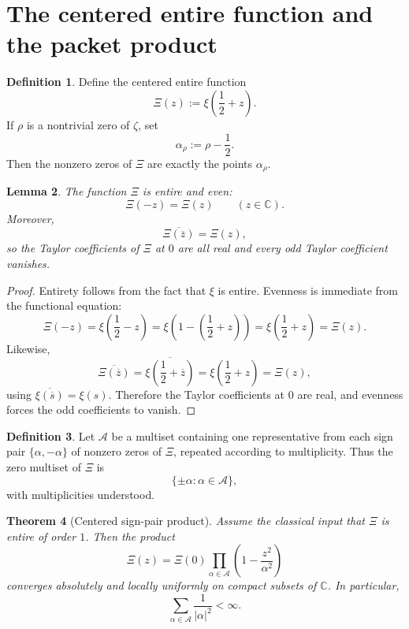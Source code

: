 \documentclass[11pt,a4paper]{article}
\numberwithin{equation}{section}
\newtheorem{theorem}{Theorem}[section]
\newtheorem{lemma}[theorem]{Lemma}
\theoremstyle{definition}
\newtheorem{definition}[theorem]{Definition}
\theoremstyle{remark}
\newcommand{\CC}{\mathbb C}
\begin{document}
\section{The centered entire function and the packet product}

\begin{definition}
Define the centered entire function
\[
\Xi(z):=\xi\!\left(\frac12+z\right).
\]
If $\rho$ is a nontrivial zero of $\zeta$, set
\[
\alpha_\rho:=\rho-\frac12.
\]
Then the nonzero zeros of $\Xi$ are exactly the points $\alpha_\rho$.
\end{definition}

\begin{lemma}\label{lem:Xi-even-and-real}
The function $\Xi$ is entire and even:
\[
\Xi(-z)=\Xi(z)
\qquad (z\in\CC).
\]
Moreover,
\[
\overline{\Xi(\overline z)}=\Xi(z),
\]
so the Taylor coefficients of $\Xi$ at $0$ are all real and every odd Taylor coefficient vanishes.
\end{lemma}

\begin{proof}
Entirety follows from the fact that $\xi$ is entire.  Evenness is immediate from the functional equation:
\[
\Xi(-z)=\xi\!\left(\frac12-z\right)=\xi\!\left(1-\left(\frac12+z\right)\right)=\xi\!\left(\frac12+z\right)=\Xi(z).
\]
Likewise,
\[
\overline{\Xi(\overline z)}=\overline{\xi\!\left(\frac12+\overline z\right)}=\xi\!\left(\frac12+z\right)=\Xi(z),
\]
using $\overline{\xi(\overline s)}=\xi(s)$.  Therefore the Taylor coefficients at $0$ are real, and evenness forces the odd coefficients to vanish.
\end{proof}

\begin{definition}
Let $\mathcal A$ be a multiset containing one representative from each sign pair $\{\alpha,-\alpha\}$ of nonzero zeros of $\Xi$, repeated according to multiplicity.  Thus the zero multiset of $\Xi$ is
\[
\{\pm\alpha:\alpha\in\mathcal A\},
\]
with multiplicities understood.
\end{definition}

\begin{theorem}[Centered sign-pair product]\label{thm:centered-sign-pair-product}
Assume the classical input that $\Xi$ is entire of order $1$.  Then the product
\begin{equation}\label{eq:Xi-sign-pair-product}
\Xi(z)=\Xi(0)\prod_{\alpha\in\mathcal A}\left(1-\frac{z^2}{\alpha^2}\right)
\end{equation}
converges absolutely and locally uniformly on compact subsets of $\CC$.  In particular,
\[
\sum_{\alpha\in\mathcal A}\frac{1}{|\alpha|^2}<\infty.
\]
\end{theorem}
\end{document}
